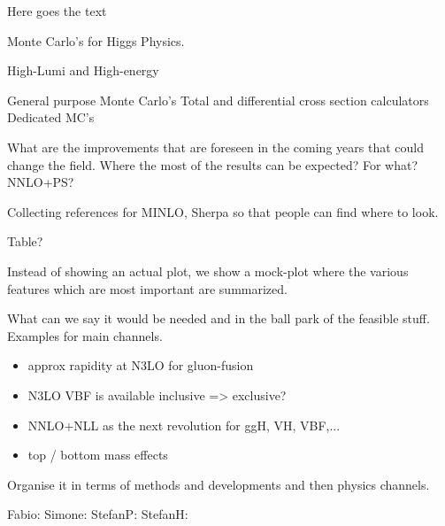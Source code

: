 
Here goes the text

Monte Carlo's for Higgs Physics.

High-Lumi and High-energy

General purpose Monte Carlo's 
Total and differential cross section calculators
Dedicated MC's 

What are the improvements that are foreseen in the coming years that could change the field. Where the most of the results can be expected? For what? NNLO+PS? 

Collecting references for MINLO, Sherpa so that people can find where to look. 

Table?

Instead of showing an actual plot, we show a mock-plot where
the various features which are most important are summarized. 

What can we say it would be needed and in the ball park of the feasible stuff. Examples for main channels.

\begin{itemize}
\item approx rapidity at N3LO for gluon-fusion
\item N3LO VBF is available inclusive => exclusive?
\item NNLO+NLL as the next revolution for ggH, VH, VBF,...
\item top / bottom mass effects
\end{itemize}

Organise it in terms of methods and developments and then physics channels.

Fabio: 
Simone:
StefanP:
StefanH: 

